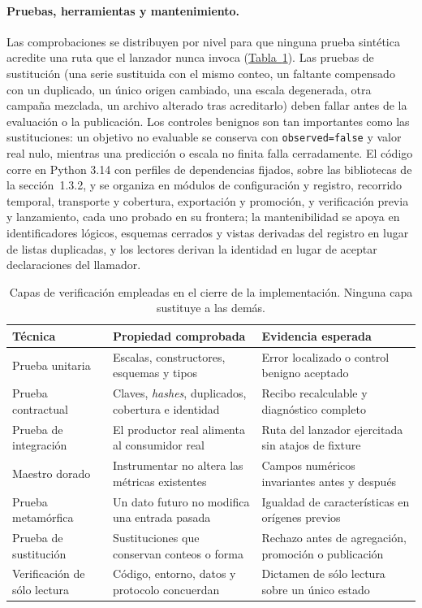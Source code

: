 \documentclass[12pt,letterpaper]{report}
\begin{document}
\paragraph{Pruebas, herramientas y mantenimiento.} Las comprobaciones se distribuyen por nivel
para que ninguna prueba sintética acredite una ruta que el lanzador nunca invoca
(\hyperref[tab:pruebas_a10]{Tabla~\ref*{tab:pruebas_a10}}). Las pruebas de sustitución (una serie sustituida con el mismo
conteo, un faltante compensado con un duplicado, un único origen cambiado, una escala degenerada,
otra campaña mezclada, un archivo alterado tras acreditarlo) deben fallar antes de la evaluación o
la publicación. Los controles benignos son tan importantes como las sustituciones: un objetivo no evaluable se conserva con
\texttt{observed=false} y valor real nulo, mientras una predicción o escala no finita falla
cerradamente. El código corre en Python 3.14 con perfiles de dependencias fijados, sobre las
bibliotecas de la sección~1.3.2, y se organiza en módulos de configuración y registro, recorrido
temporal, transporte y cobertura, exportación y promoción, y verificación previa y lanzamiento,
cada uno probado en su frontera; la mantenibilidad se apoya en identificadores lógicos, esquemas cerrados y vistas
derivadas del registro en lugar de listas duplicadas, y los lectores derivan la identidad en lugar
de aceptar declaraciones del llamador.

\begin{table}[htbp]
\centering
\footnotesize
\caption[Pruebas y evidencia de la implementación]{Capas de verificación empleadas en el cierre de la
implementación. Ninguna capa sustituye a las demás.}
\label{tab:pruebas_a10}
\begin{tabular}{@{}p{3.4cm}p{5.0cm}p{4.8cm}@{}}
\toprule
\rowcolor{uacjblue!15}
\textbf{Técnica} & \textbf{Propiedad comprobada} & \textbf{Evidencia esperada} \\ \midrule
Prueba unitaria & Escalas, constructores, esquemas y tipos & Error localizado o control benigno aceptado \\
Prueba contractual & Claves, \textit{hashes}, duplicados, cobertura e identidad & Recibo recalculable y diagnóstico completo \\
Prueba de integración & El productor real alimenta al consumidor real & Ruta del lanzador ejercitada sin atajos de fixture \\
Maestro dorado & Instrumentar no altera las métricas existentes & Campos numéricos invariantes antes y después \\
Prueba metamórfica & Un dato futuro no modifica una entrada pasada & Igualdad de características en orígenes previos \\
Prueba de sustitución & Sustituciones que conservan conteos o forma & Rechazo antes de agregación, promoción o publicación \\
Verificación de sólo lectura & Código, entorno, datos y protocolo concuerdan & Dictamen de sólo lectura sobre un único estado \\ \bottomrule
\end{tabular}
\end{table}
\end{document}
